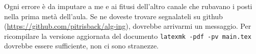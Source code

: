 Ogni errore è da imputare a me e ai fitusi dell'altro canale che rubavano i posti nella prima metà dell'aula. Se ne doveste trovare segnalateli su github (\url{https://github.com/pitrisback/alg-ing}), dovrebbe arrivarmi un messaggio. Per ricompilare la versione aggiornata del documento \texttt{latexmk -pdf -pv main.tex} dovrebbe essere sufficiente, non ci sono stranezze.

